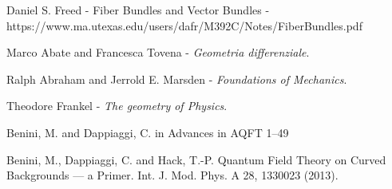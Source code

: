 \documentclass[a4paper,12pt]{scrartcl}    %
\begin{document}
\begin{thebibliography}{100}
 Daniel S. Freed - Fiber Bundles and Vector Bundles -https://www.ma.utexas.edu/users/dafr/M392C/Notes/FiberBundles.pdf

 Marco Abate and Francesca Tovena - \emph{Geometria differenziale}.

 Ralph Abraham and Jerrold E. Marsden -  \emph{Foundations of Mechanics}.

 Theodore Frankel -  \emph{The geometry of Physics}.

 Benini, M. and Dappiaggi, C. in Advances in AQFT 1–49

 Benini, M., Dappiaggi, C. and Hack, T.-P. Quantum Field Theory on Curved Backgrounds — a Primer. Int. J. Mod. Phys. A 28, 1330023 (2013).

\end{thebibliography}
\end{document}
